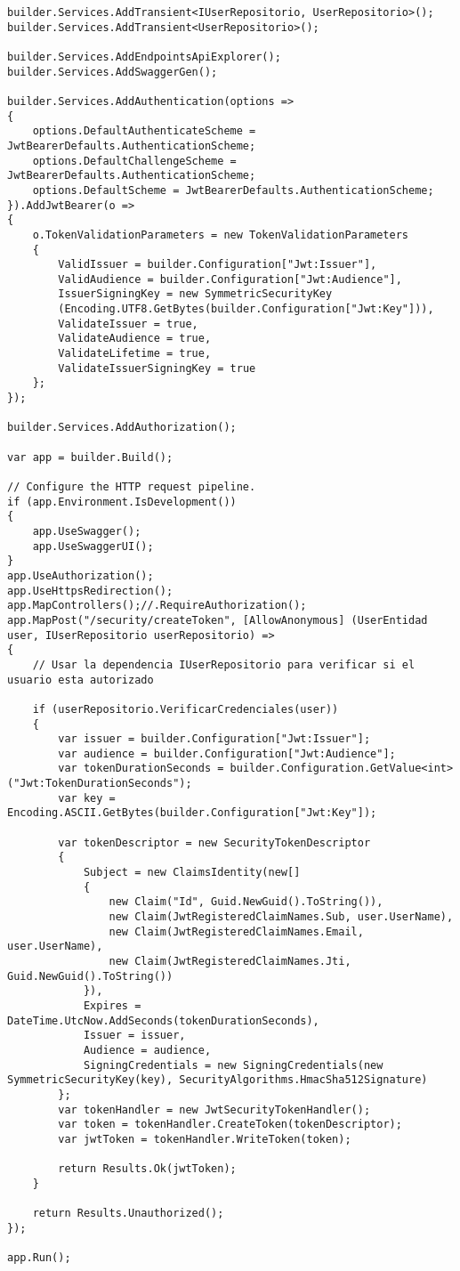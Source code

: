 \documentclass[executivepaper]{article}
\begin{document}
\begin{lstlisting}
builder.Services.AddTransient<IUserRepositorio, UserRepositorio>();
builder.Services.AddTransient<UserRepositorio>();

builder.Services.AddEndpointsApiExplorer();
builder.Services.AddSwaggerGen();

builder.Services.AddAuthentication(options =>
{
    options.DefaultAuthenticateScheme = JwtBearerDefaults.AuthenticationScheme;
    options.DefaultChallengeScheme = JwtBearerDefaults.AuthenticationScheme;
    options.DefaultScheme = JwtBearerDefaults.AuthenticationScheme;
}).AddJwtBearer(o =>
{
    o.TokenValidationParameters = new TokenValidationParameters
    {
        ValidIssuer = builder.Configuration["Jwt:Issuer"],
        ValidAudience = builder.Configuration["Jwt:Audience"],
        IssuerSigningKey = new SymmetricSecurityKey
        (Encoding.UTF8.GetBytes(builder.Configuration["Jwt:Key"])),
        ValidateIssuer = true,
        ValidateAudience = true,
        ValidateLifetime = true,
        ValidateIssuerSigningKey = true
    };
});

builder.Services.AddAuthorization();

var app = builder.Build();

// Configure the HTTP request pipeline.
if (app.Environment.IsDevelopment())
{
    app.UseSwagger();
    app.UseSwaggerUI();
}
app.UseAuthorization();
app.UseHttpsRedirection();
app.MapControllers();//.RequireAuthorization();
app.MapPost("/security/createToken", [AllowAnonymous] (UserEntidad user, IUserRepositorio userRepositorio) =>
{
    // Usar la dependencia IUserRepositorio para verificar si el usuario esta autorizado

    if (userRepositorio.VerificarCredenciales(user))
    {
        var issuer = builder.Configuration["Jwt:Issuer"];
        var audience = builder.Configuration["Jwt:Audience"];
        var tokenDurationSeconds = builder.Configuration.GetValue<int>("Jwt:TokenDurationSeconds");
        var key = Encoding.ASCII.GetBytes(builder.Configuration["Jwt:Key"]);

        var tokenDescriptor = new SecurityTokenDescriptor
        {
            Subject = new ClaimsIdentity(new[]
            {
                new Claim("Id", Guid.NewGuid().ToString()),
                new Claim(JwtRegisteredClaimNames.Sub, user.UserName),
                new Claim(JwtRegisteredClaimNames.Email, user.UserName),
                new Claim(JwtRegisteredClaimNames.Jti, Guid.NewGuid().ToString())
            }),
            Expires = DateTime.UtcNow.AddSeconds(tokenDurationSeconds),
            Issuer = issuer,
            Audience = audience,
            SigningCredentials = new SigningCredentials(new SymmetricSecurityKey(key), SecurityAlgorithms.HmacSha512Signature)
        };
        var tokenHandler = new JwtSecurityTokenHandler();
        var token = tokenHandler.CreateToken(tokenDescriptor);
        var jwtToken = tokenHandler.WriteToken(token);

        return Results.Ok(jwtToken);
    }

    return Results.Unauthorized();
});

app.Run();
\end{lstlisting}
\end{document}
